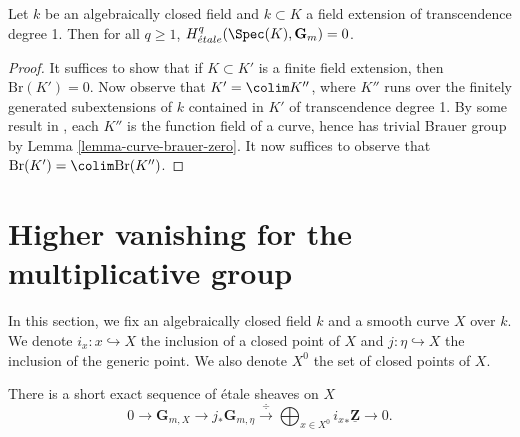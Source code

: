 \begin{lemma}
\label{lemma-cohomology-Gm-function-field-curve}
Let $k$ be an algebraically closed field and $k \subset K$ a field extension
of transcendence degree 1. Then for all $q \geq 1$,
$H_{\acute{e}tale}^q(\Spec(K), \mathbf{G}_m) = 0$.
\end{lemma}

\begin{proof}
It suffices to show that if $K \subset K'$ is a finite field extension, then
$\text{Br}(K') = 0$. Now observe that $K' = \colim K''$, where $K''$ runs
over the finitely generated subextensions of $k$ contained in $K'$ of
transcendence degree 1. By some result in \cite{H}, each $K''$ is the function
field of a curve, hence has trivial Brauer group by
Lemma \ref{lemma-curve-brauer-zero}.
It now suffices to observe that $\text{Br}(K') = \colim \text{Br}(K'')$.
\end{proof}






\section{Higher vanishing for the multiplicative group}
\label{section-higher-Gm}

\noindent
In this section, we fix an algebraically closed field $k$ and a smooth curve
$X$ over $k$. We denote $i_x : x \hookrightarrow X$ the inclusion of a closed
point of $X$ and $j : \eta \hookrightarrow X$ the inclusion of the generic
point. We also denote $X^0$ the set of closed points of $X$.

\begin{theorem}
\label{theorem-fundamental-exact-sequence}
There is a short exact sequence of \'etale sheaves on $X$
$$
0 \longrightarrow \mathbf{G}_{m, X} \longrightarrow j_* \mathbf{G}_{m, \eta}
\xrightarrow{\ \div\ } \bigoplus_{x \in X^0} {i_x}_* \underline{\mathbf{Z}}
\longrightarrow 0.
$$
\end{theorem}

